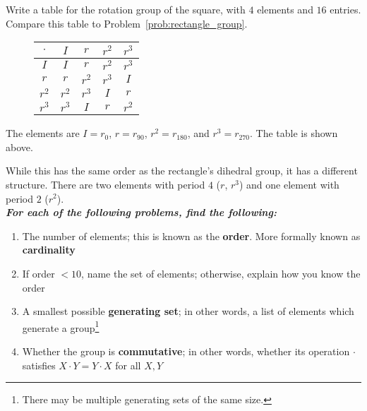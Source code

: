 \documentclass[../key.tex]{subfiles}
\begin{document}
\begin{outer_problem}
\item Write a table for the rotation group of the square, with $4$ elements and $16$ entries. Compare this table to Problem~\ref{prob:rectangle_group}.
\end{outer_problem}

\begin{figure}[h]
	\begin{center}
		\begin{minipage}[b]{\textwidth}
			\centering
			\begin{tabular}{c|cccc}
				\hline
				$\cdot$ & $I$ & $r$ & $r^2$ & $r^3$ \\ \hline
				\rowcolor{light-gray}
				$I$ & $I$ & $r$ & $r^2$ & $r^3$ \\
				$r$ & $r$ & $r^2$ & $r^3$ & $I$ \\
				\rowcolor{light-gray}
				$r^2$ & $r^2$ & $r^3$ & $I$ & $r$ \\
				$r^3$ & $r^3$ & $I$ & $r$ & $r^2$ \\ \hline
			\end{tabular}
			\vspace*{0.5\baselineskip}
		\end{minipage}
	\end{center}
	\vspace*{-2\baselineskip}
\end{figure}%

\noindent The elements are $I=r_0$, $r=r_{90}$, $r^2=r_{180}$, and $r^3=r_{270}$. The table is shown above.

While this has the same order as the rectangle's dihedral group, it has a different structure. There are two elements with period $4$ ($r$, $r^3$) and one element with period $2$ ($r^2$).\\

\noindent\textbf{\textit{For each of the following problems, find the following:}}

\begin{enumerate}[label=(\alph*)]
\item The number of elements; this is known as the \textbf{order}. More formally known as \textbf{cardinality}
\item If order $< 10$, name the set of elements; otherwise, explain how you know the order
\item A smallest possible \textbf{generating set}; in other words, a list of elements which generate a group\footnote{There may be multiple generating sets of the same size.}
\item Whether the group is \textbf{commutative}; in other words, whether its operation $\cdot$ satisfies $X\cdot Y=Y\cdot X$ for all $X,Y$
\end{enumerate}
\end{document}
